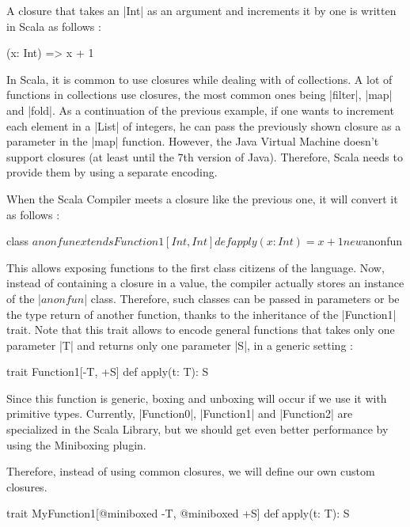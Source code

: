 A closure that takes an |Int| as an argument and increments it by one is written in Scala as follows :

\begin{lstlisting-nobreak}
 (x: Int) => x + 1
\end{lstlisting-nobreak}

In Scala, it is common to use closures while dealing with of collections. A lot of functions in collections use closures, the most common ones being |filter|, |map| and |fold|. As a continuation of the previous example, if one wants to increment each element in a |List| of integers, he can pass the previously shown closure as a parameter in the |map| function. However, the Java Virtual Machine doesn't support closures (at least until the 7th version of Java). Therefore, Scala needs to provide them by using a separate encoding.

When the Scala Compiler meets a closure like the previous one, it will convert it as follows :

\begin{lstlisting-nobreak}
 {
  class $anonfun extends Function1[Int, Int] {
    def apply(x: Int) = x + 1
  }
  
  new $anonfun
 }
\end{lstlisting-nobreak}

This allows exposing functions to the first class citizens of the language. Now, instead of containing a closure in a value, the compiler actually stores an instance of the |$anonfun$| class. Therefore, such classes can be passed in parameters or be the type return of another function, thanks to the inheritance of the |Function1| trait. Note that this trait allows to encode general functions that takes only one parameter |T| and returns only one parameter |S|, in a generic setting :

\begin{lstlisting-nobreak}
 trait Function1[-T, +S] {
   def apply(t: T): S
 }
\end{lstlisting-nobreak}

Since this function is generic, boxing and unboxing will occur if we use it with primitive types. Currently, |Function0|, |Function1| and |Function2| are specialized in the Scala Library, but we should get even better performance by using the Miniboxing plugin.

Therefore, instead of using common closures, we will define our own custom closures. 

\begin{lstlisting-nobreak}
 trait MyFunction1[@miniboxed -T, @miniboxed +S] {
   def apply(t: T): S
 }
\end{lstlisting-nobreak}

